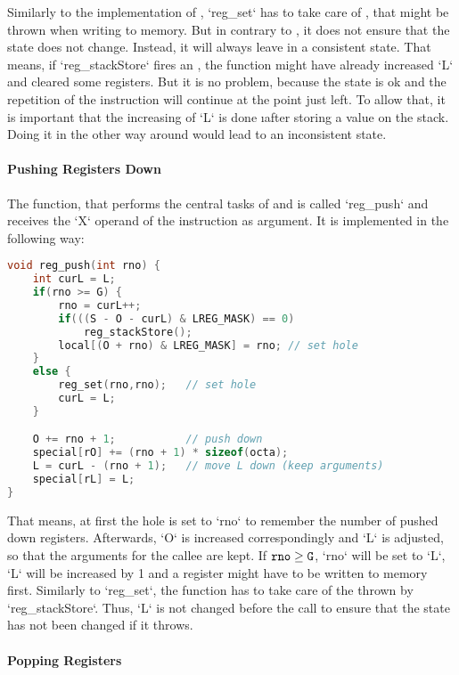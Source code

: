 Similarly to the implementation of , `reg_set` has to take care of , that might be thrown when writing to memory. But in contrary to , it does not ensure that the state does not change. Instead, it will always leave in a consistent state. That means, if `reg_stackStore` fires an , the function might have already increased `L` and cleared some registers. But it is no problem, because the state is ok and the repetition of the instruction will continue at the point just left. To allow that, it is important that the increasing of `L` is done \i{after} storing a value on the stack. Doing it in the other way around would lead to an inconsistent state.

\paragraph{Pushing Registers Down}

The function, that performs the central tasks of  and  is called `reg_push` and receives the `X` operand of the instruction as argument. It is implemented in the following way:
\begin{lstlisting}[language=C,caption=Implementation of {\tt reg\_push}]
void reg_push(int rno) {
	int curL = L;
	if(rno >= G) {
		rno = curL++;
		if(((S - O - curL) & LREG_MASK) == 0)
			reg_stackStore();
		local[(O + rno) & LREG_MASK] = rno;	// set hole
	}
	else {
		reg_set(rno,rno);	// set hole
		curL = L;
	}

	O += rno + 1;			// push down
	special[rO] += (rno + 1) * sizeof(octa);
	L = curL - (rno + 1);	// move L down (keep arguments)
	special[rL] = L;
}
\end{lstlisting}
That means, at first the hole is set to `rno` to remember the number of pushed down registers. Afterwards, `O` is increased correspondingly and `L` is adjusted, so that the arguments for the callee are kept. If ${\tt rno} \ge {\tt G}$, `rno` will be set to `L`, `L` will be increased by 1 and a register might have to be written to memory first. Similarly to `reg_set`, the function has to take care of the  thrown by `reg_stackStore`. Thus, `L` is not changed before the call to ensure that the state has not been changed if it throws.

\paragraph{Popping Registers}

